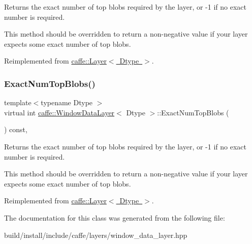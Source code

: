 Returns the exact number of top blobs required by the layer, or -\/1 if no exact number is required. 

This method should be overridden to return a non-\/negative value if your layer expects some exact number of top blobs. 

Reimplemented from \mbox{\hyperlink{classcaffe_1_1_layer_a64e2ca72c719e4b2f1f9216ccfb0d37f}{caffe\+::\+Layer$<$ Dtype $>$}}.

\mbox{\label{classcaffe_1_1_window_data_layer_a7bd9264758f462b3392d2eedec8b1c99}} 
\subsubsection{\texorpdfstring{Exact\+Num\+Top\+Blobs()}{ExactNumTopBlobs()}\hspace{0.1cm}{\footnotesize\ttfamily [2/2]}}
{\footnotesize\ttfamily template$<$typename Dtype $>$ \\
virtual int \mbox{\hyperlink{classcaffe_1_1_window_data_layer}{caffe\+::\+Window\+Data\+Layer}}$<$ Dtype $>$\+::Exact\+Num\+Top\+Blobs (\begin{DoxyParamCaption}{ }\end{DoxyParamCaption}) const\hspace{0.3cm}{\ttfamily [inline]}, {\ttfamily [virtual]}}



Returns the exact number of top blobs required by the layer, or -\/1 if no exact number is required. 

This method should be overridden to return a non-\/negative value if your layer expects some exact number of top blobs. 

Reimplemented from \mbox{\hyperlink{classcaffe_1_1_layer_a64e2ca72c719e4b2f1f9216ccfb0d37f}{caffe\+::\+Layer$<$ Dtype $>$}}.



The documentation for this class was generated from the following file\+:\begin{DoxyCompactItemize}
\item 
build/install/include/caffe/layers/window\+\_\+data\+\_\+layer.\+hpp\end{DoxyCompactItemize}
